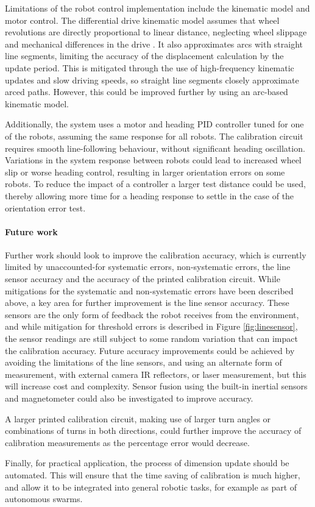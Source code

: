 \documentclass[conference]{IEEEtran}
\begin{document}
Limitations of the robot control implementation include the kinematic model and motor control. 
The differential drive kinematic model assumes that wheel revolutions are directly proportional to linear distance, neglecting wheel slippage and mechanical differences in the drive \cite{odometry}. 
It also approximates arcs with straight line segments, limiting the accuracy of the displacement calculation by the update period. This is mitigated through the use of high-frequency kinematic updates and slow driving speeds, so straight line segments closely approximate arced paths.
However, this could be improved further by using an arc-based kinematic model.

Additionally, the system uses a motor and heading PID controller tuned for one of the robots, assuming the same response for all robots.
The calibration circuit requires smooth line-following behaviour, without significant heading oscillation.
Variations in the system response between robots could lead to increased wheel slip or worse heading control, resulting in larger orientation errors on some robots. 
To reduce the impact of a controller a larger test distance could be used, thereby allowing more time for a heading response to settle in the case of the orientation error test.


\paragraph{Future work}

Further work should look to improve the calibration accuracy, which is currently limited by unaccounted-for systematic errors, non-systematic errors, the line sensor accuracy and the accuracy of the printed calibration circuit. 
While mitigations for the systematic and non-systematic errors have been described above, a key area for further improvement is the line sensor accuracy. 
These sensors are the only form of feedback the robot receives from the environment, and while mitigation for threshold errors is described in Figure \ref{fig:linesensor}, the sensor readings are still subject to some random variation that can impact the calibration accuracy.
Future accuracy improvements could be achieved by avoiding the limitations of the line sensors, and using an alternate form of measurement, with external camera IR reflectors, or laser measurement, but this will increase cost and complexity.
Sensor fusion using the built-in inertial sensors and magnetometer could also be investigated to improve accuracy. 

A larger printed calibration circuit, making use of larger turn angles or combinations of turns in both directions, could further improve the accuracy of calibration measurements as the percentage error would decrease.

Finally, for practical application, the process of dimension update should be automated. This will ensure that the time saving of calibration is much higher, and allow it to be integrated into general robotic tasks, for example as part of autonomous swarms.


 

\end{document}
